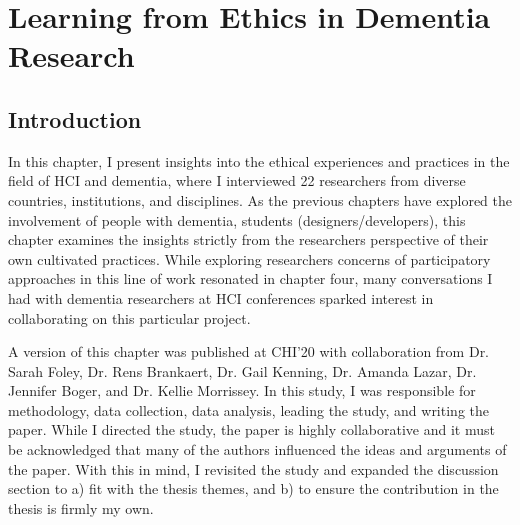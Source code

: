 \chapter{Learning from Ethics in Dementia Research}
\label{EthicsChapter}

\section{Introduction}
\label{Ethics:Intro}
In this chapter, I present insights into the ethical experiences and practices in the field of HCI and dementia, where I interviewed 22 researchers from diverse countries, institutions, and disciplines. As the previous chapters have explored the involvement of people with dementia, students (designers/developers), this chapter examines the insights strictly from the researchers perspective of their own cultivated practices. While exploring researchers concerns of participatory approaches in this line of work resonated in chapter four, many conversations I had with dementia researchers at HCI conferences sparked interest in collaborating on this particular project. 

A version of this chapter was published at CHI'20 \citep{hodge_relational_2020} with collaboration from  Dr. Sarah Foley, Dr. Rens Brankaert, Dr. Gail Kenning, Dr. Amanda Lazar, Dr. Jennifer Boger, and Dr. Kellie Morrissey. In this study, I was responsible for methodology, data collection, data analysis, leading the study, and writing the paper. While I directed the study, the paper is highly collaborative and it must be acknowledged that many of the authors influenced the ideas and arguments of the paper. With this in mind, I revisited the study and expanded the discussion section to a) fit with the thesis themes, and b) to ensure the contribution in the thesis is firmly my own.

